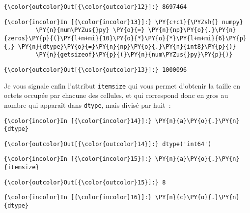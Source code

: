 \begin{Verbatim}[commandchars=\\\{\}]
{\color{outcolor}Out[{\color{outcolor}12}]:} 8697464
\end{Verbatim}
            
    \begin{Verbatim}[commandchars=\\\{\}]
{\color{incolor}In [{\color{incolor}13}]:} \PY{c+c1}{\PYZsh{} numpy}
         \PY{n}{num\PYZus{}py} \PY{o}{=} \PY{n}{np}\PY{o}{.}\PY{n}{zeros}\PY{p}{(}\PY{l+m+mi}{10}\PY{o}{*}\PY{o}{*}\PY{l+m+mi}{6}\PY{p}{,} \PY{n}{dtype}\PY{o}{=}\PY{n}{np}\PY{o}{.}\PY{n}{int8}\PY{p}{)}
         \PY{n}{getsizeof}\PY{p}{(}\PY{n}{num\PYZus{}py}\PY{p}{)}
\end{Verbatim}


\begin{Verbatim}[commandchars=\\\{\}]
{\color{outcolor}Out[{\color{outcolor}13}]:} 1000096
\end{Verbatim}
            
    Je vous signale enfin l'attribut \texttt{itemsize} qui vous permet
d'obtenir la taille en octets occupée par chacune des cellules, et qui
correspond donc en gros au nombre qui apparaît dans \texttt{dtype}, mais
divisé par huit~:

    \begin{Verbatim}[commandchars=\\\{\}]
{\color{incolor}In [{\color{incolor}14}]:} \PY{n}{a}\PY{o}{.}\PY{n}{dtype}
\end{Verbatim}


\begin{Verbatim}[commandchars=\\\{\}]
{\color{outcolor}Out[{\color{outcolor}14}]:} dtype('int64')
\end{Verbatim}
            
    \begin{Verbatim}[commandchars=\\\{\}]
{\color{incolor}In [{\color{incolor}15}]:} \PY{n}{a}\PY{o}{.}\PY{n}{itemsize}
\end{Verbatim}


\begin{Verbatim}[commandchars=\\\{\}]
{\color{outcolor}Out[{\color{outcolor}15}]:} 8
\end{Verbatim}
            
    \begin{Verbatim}[commandchars=\\\{\}]
{\color{incolor}In [{\color{incolor}16}]:} \PY{n}{c}\PY{o}{.}\PY{n}{dtype}
\end{Verbatim}


